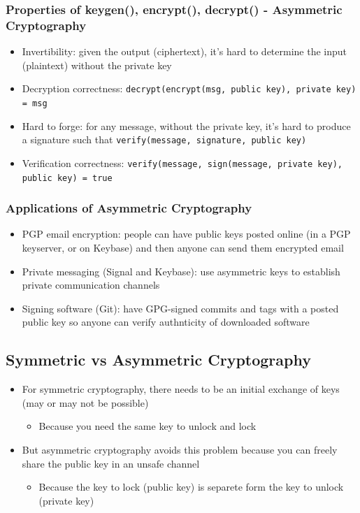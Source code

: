 \documentclass[letterpaper,12pt]{article}
\begin{document}
\subsubsection{Properties of keygen(), encrypt(), decrypt() - Asymmetric Cryptography}
\begin{itemize}
 \item Invertibility: given the output (ciphertext), it's hard to determine the input (plaintext) without the private key
 \item Decryption correctness: \lstinline{decrypt(encrypt(msg, public key), private key) = msg}
 \item Hard to forge: for any message, without the private key, it's hard to produce a signature such that \lstinline{verify(message, signature, public key)}
 \item Verification correctness: \lstinline{verify(message, sign(message, private key), public key) = true}
\end{itemize}


\subsubsection{Applications of Asymmetric Cryptography}
\begin{itemize}
 \item PGP email encryption: people can have public keys posted online (in a PGP keyserver, or on Keybase) and then anyone can send them encrypted email
 \item Private messaging (Signal and Keybase): use asymmetric keys to establish private communication channels
 \item Signing software (Git): have GPG-signed commits and tags with a posted public key so anyone can verify authnticity of downloaded software
\end{itemize}

\subsection{Symmetric vs Asymmetric Cryptography}
\begin{itemize}
 \item For symmetric cryptography, there needs to be an initial exchange of keys (may or may not be possible)
       \begin{itemize}
        \item Because you need the same key to unlock and lock
       \end{itemize}
 \item But asymmetric cryptography avoids this problem because you can freely share the public key in an unsafe channel
       \begin{itemize}
        \item Because the key to lock (public key) is separete form the key to unlock (private key)
       \end{itemize}
\end{itemize}
\end{document}
